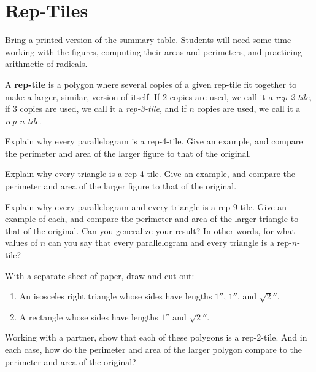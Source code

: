 \newpage
\section{Rep-Tiles}
\begin{teachingnote}
Bring a printed version of the summary table.   Students will need some time working with the figures, computing their areas and perimeters, and practicing arithmetic of radicals.  
\end{teachingnote}

A \textbf{rep-tile} is a polygon where several copies of
a given rep-tile fit together to make a larger, similar, version of
itself. If $2$ copies are used, we call it a \textit{rep-2-tile}, if
$3$ copies are used, we call it a \textit{rep-3-tile}, and if $n$ copies
are used, we call it a \textit{rep-n-tile}.

\begin{prob}
Explain why every parallelogram is a rep-4-tile. Give an example, and compare the perimeter and area of the larger figure to that of the original.
\end{prob}

\begin{prob}
Explain why every triangle is a rep-4-tile. Give an example, and compare the perimeter and area of the larger figure to that of the
original.
\end{prob}

\begin{prob}
Explain why every parallelogram and every triangle is a rep-9-tile. Give an example of each, and compare the perimeter and area of the larger triangle to that of the original. Can you generalize your result?  In other words, for what values of $n$ can you say that every parallelogram and every triangle is a rep-$n$-tile?  
\end{prob}

\begin{prob}
With a separate sheet of paper, draw and cut out:
\begin{enumerate}
\item An isosceles right triangle whose sides have lengths $1''$, $1''$, and $\sqrt{2}''$.
\item A rectangle whose sides have lengths $1''$ and $\sqrt{2}''$.
\end{enumerate}
Working with a partner, show that each of these polygons is a rep-2-tile.  And in each case,
how do the perimeter and area of the larger polygon compare to the perimeter and area of the original?
\end{prob}

